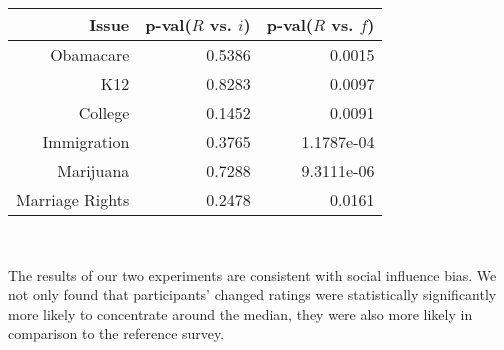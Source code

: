 {\centering
\scriptsize
\begin{tabular}[!ht] { r | r | r }
\label{ref-1}
  Issue & p-val($R$ vs. $i$) & p-val($R$ vs. $f$) \\
  \hline
  \hline
  Obamacare &  0.5386 & 0.0015 \\
  \hline
  K12 & 0.8283 & 0.0097 \\
  \hline
  College & 0.1452 & 0.0091 \\
  \hline
  Immigration & 0.3765 & 1.1787e-04\\
  \hline
  Marijuana & 0.7288 & 9.3111e-06\\
  \hline
  Marriage Rights & 0.2478 & 0.0161 \\
\end{tabular}\\[1\baselineskip]
}

The results of our two experiments are consistent with social influence bias.
We not only found that participants' changed ratings were statistically significantly more likely to concentrate around the median, they were also more likely in comparison to the reference survey.



